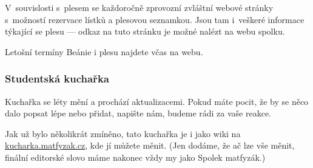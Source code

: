 V~souvislosti s~plesem se každoročně zprovozní zvláštní webové
stránky s~možností rezervace lístků a plesovou seznamkou. Jsou tam
i~veškeré informace týkající se plesu --- odkaz na tuto stránku je
možné nalézt na webu spolku.

Letošní termíny Beánie i plesu najdete včas na webu.

\subsubsection{Studentská kuchařka}

Kuchařka se léty mění a prochází aktualizacemi. Pokud máte pocit,
že by se něco dalo popsat lépe nebo přidat, napište nám, budeme
rádi za vaše reakce.

Jak už bylo několikrát zmíněno, tato kuchařka je i jako wiki na \url{kucharka.matfyzak.cz}, kde jí můžete měnit. (Jen dodáme, že ač lze vše měnit, finální editorské slovo máme nakonec vždy my jako Spolek matfyzák.)